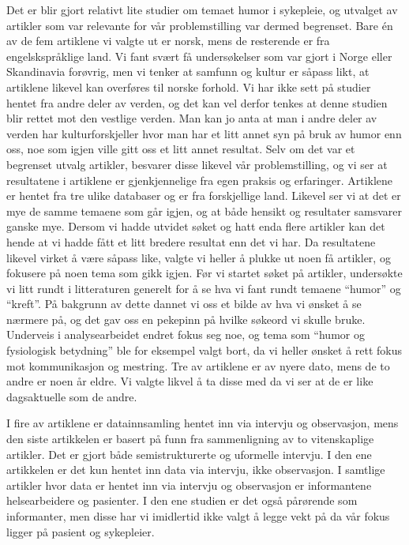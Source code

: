 Det er blir gjort relativt lite studier om temaet humor i sykepleie, og
utvalget av artikler som var relevante for vår problemstilling var dermed
begrenset. Bare én av de fem artiklene vi valgte ut er norsk, mens de
resterende er fra engelskspråklige land. Vi fant svært få undersøkelser som var
gjort i Norge eller Skandinavia forøvrig, men vi tenker at samfunn og kultur er
såpass likt, at artiklene likevel kan overføres til norske forhold. Vi har ikke
sett på studier hentet fra andre deler av verden, og det kan vel derfor tenkes
at denne studien blir rettet mot den vestlige verden. Man kan jo anta at man i
andre deler av verden har kulturforskjeller hvor man har et litt annet syn på
bruk av humor enn oss, noe som igjen ville gitt oss et litt annet resultat.
Selv om det var et begrenset utvalg artikler, besvarer disse likevel vår
problemstilling, og vi ser at resultatene i artiklene er gjenkjennelige fra
egen praksis og erfaringer.  Artiklene er hentet fra tre ulike databaser og er
fra forskjellige land. Likevel ser vi at det er mye de samme temaene som går
igjen, og at både hensikt og resultater samsvarer ganske mye. Dersom vi hadde
utvidet søket og hatt enda flere artikler kan det hende at vi hadde fått et
litt bredere resultat enn det vi har. Da resultatene likevel virket å være
såpass like, valgte vi heller å plukke ut noen få artikler, og fokusere på noen
tema som gikk igjen. Før vi startet søket på artikler, undersøkte vi litt rundt
i litteraturen generelt for å se hva vi fant rundt temaene “humor” og “kreft”.
På bakgrunn av dette dannet vi oss et bilde av hva vi ønsket å se nærmere på,
og det gav oss en pekepinn på hvilke søkeord vi skulle bruke. Underveis i
analysearbeidet endret fokus seg noe, og tema som “humor og fysiologisk
betydning” ble for eksempel valgt bort, da vi heller ønsket å rett fokus mot
kommunikasjon og mestring.  Tre av artiklene er av nyere dato, mens de to andre
er noen år eldre. Vi valgte likvel å ta disse med da vi ser at de er like
dagsaktuelle som de andre.

I fire av artiklene er datainnsamling hentet inn via intervju og observasjon,
mens den siste artikkelen er basert på funn fra sammenligning av to
vitenskaplige artikler. Det er gjort både semistrukturerte og uformelle
intervju.  I den ene  artikkelen er det kun hentet inn data via intervju, ikke
observasjon. I samtlige artikler hvor data er hentet inn via intervju og
observasjon er informantene helsearbeidere og pasienter. I den ene studien er
det også pårørende som informanter, men disse har vi imidlertid ikke valgt å
legge vekt på da vår fokus ligger på pasient og sykepleier.

